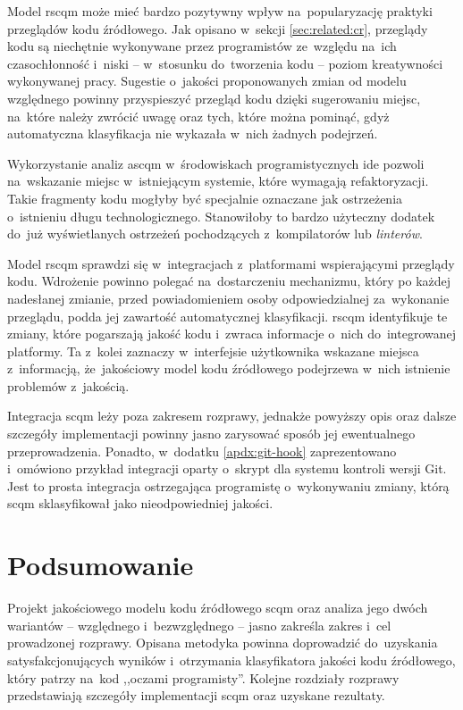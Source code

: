 \documentclass[twoside]{praca}
\begin{document}
Model \gls{rscqm} może mieć bardzo pozytywny wpływ na~popularyzację praktyki przeglądów kodu źródłowego. Jak opisano w~sekcji \ref{sec:related:cr}, przeglądy kodu są niechętnie wykonywane przez programistów ze~względu na~ich czasochłonność i~niski -- w~stosunku do~tworzenia kodu -- poziom kreatywności wykonywanej pracy. Sugestie o~jakości proponowanych zmian od modelu względnego powinny przyspieszyć przegląd kodu dzięki sugerowaniu miejsc, na~które należy zwrócić uwagę oraz tych, które można pominąć, gdyż automatyczna klasyfikacja nie wykazała w~nich żadnych podejrzeń.

Wykorzystanie analiz \gls{ascqm} w~środowiskach programistycznych \gls{ide} pozwoli na~wskazanie miejsc w~istniejącym systemie, które wymagają refaktoryzacji. Takie fragmenty kodu mogłyby być specjalnie oznaczane jak ostrzeżenia o~istnieniu długu technologicznego. Stanowiłoby to bardzo użyteczny dodatek do~już wyświetlanych ostrzeżeń pochodzących z~kompilatorów lub \textit{linterów}.

Model \gls{rscqm} sprawdzi się w~integracjach z~platformami wspierającymi przeglądy kodu. Wdrożenie powinno polegać na~dostarczeniu mechanizmu, który po każdej nadesłanej zmianie, przed powiadomieniem osoby odpowiedzialnej za~wykonanie przeglądu, podda jej zawartość automatycznej klasyfikacji. \gls{rscqm} identyfikuje te zmiany, które pogarszają jakość kodu i~zwraca informacje o~nich do~integrowanej platformy. Ta z~kolei zaznaczy w~interfejsie użytkownika wskazane miejsca z~informacją, że~jakościowy model kodu źródłowego podejrzewa w~nich istnienie problemów z~jakością.

Integracja \gls{scqm} leży poza zakresem rozprawy, jednakże powyższy opis oraz dalsze szczegóły implementacji powinny jasno zarysować sposób jej ewentualnego przeprowadzenia. Ponadto, w~dodatku \ref{apdx:git-hook} zaprezentowano i~omówiono przykład integracji oparty o~skrypt dla systemu kontroli wersji Git. Jest to prosta integracja ostrzegająca programistę o~wykonywaniu zmiany, którą \gls{scqm} sklasyfikował jako nieodpowiedniej jakości.

\section{Podsumowanie}
Projekt jakościowego modelu kodu źródłowego \gls{scqm} oraz analiza jego dwóch wariantów -- względnego i~bezwzględnego -- jasno zakreśla zakres i~cel prowadzonej rozprawy. Opisana metodyka powinna doprowadzić do~uzyskania satysfakcjonujących wyników i~otrzymania klasyfikatora jakości kodu źródłowego, który patrzy na~kod ,,oczami programisty''. Kolejne rozdziały rozprawy przedstawiają szczegóły implementacji \gls{scqm} oraz uzyskane rezultaty.
\end{document}
